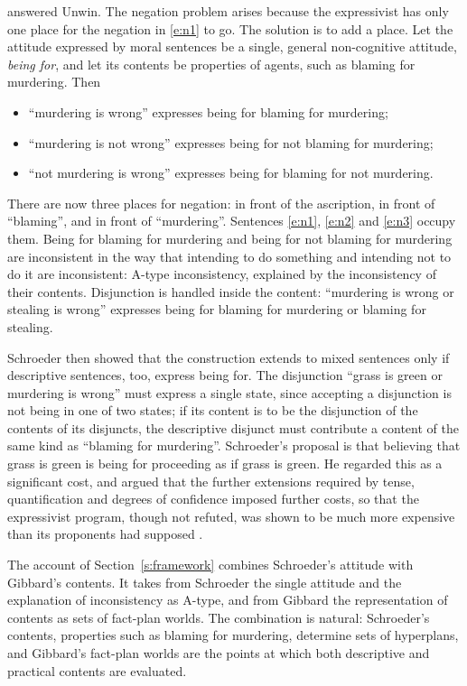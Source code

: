\documentclass{situationist-preprint}
\begin{document}
\citet{Schroeder2008book,Schroeder2008nous} answered Unwin. The negation problem arises because the expressivist has only one place for the negation in \ref{e:n1} to go. The solution is to add a place. Let the attitude expressed by moral sentences be a single, general non-cognitive attitude, \emph{being for}, and let its contents be properties of agents, such as blaming for murdering. Then
\begin{itemize}
\item \enquote{murdering is wrong} expresses being for blaming for murdering;
\item \enquote{murdering is not wrong} expresses being for not blaming for murdering;
\item \enquote{not murdering is wrong} expresses being for blaming for not murdering.
\end{itemize}
There are now three places for negation: in front of the ascription, in front of \enquote{blaming}, and in front of \enquote{murdering}. Sentences \ref{e:n1}, \ref{e:n2} and \ref{e:n3} occupy them. Being for blaming for murdering and being for not blaming for murdering are inconsistent in the way that intending to do something and intending not to do it are inconsistent: A-type inconsistency, explained by the inconsistency of their contents. Disjunction is handled inside the content: \enquote{murdering is wrong or stealing is wrong} expresses being for blaming for murdering or blaming for stealing.

Schroeder then showed that the construction extends to mixed sentences only if descriptive sentences, too, express being for. The disjunction \enquote{grass is green or murdering is wrong} must express a single state, since accepting a disjunction is not being in one of two states; if its content is to be the disjunction of the contents of its disjuncts, the descriptive disjunct must contribute a content of the same kind as \enquote{blaming for murdering}. Schroeder's proposal is that believing that grass is green is being for proceeding as if grass is green. He regarded this as a significant cost, and argued that the further extensions required by tense, quantification and degrees of confidence imposed further costs, so that the expressivist program, though not refuted, was shown to be much more expensive than its proponents had supposed \citep{Schroeder2008book}.

The account of Section~\ref{s:framework} combines Schroeder's attitude with Gibbard's contents. It takes from Schroeder the single attitude and the explanation of inconsistency as A-type, and from Gibbard the representation of contents as sets of fact-plan worlds. The combination is natural: Schroeder's contents, properties such as blaming for murdering, determine sets of hyperplans, and Gibbard's fact-plan worlds are the points at which both descriptive and practical contents are evaluated.
\end{document}
